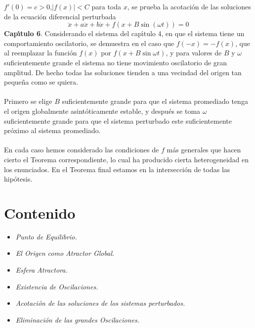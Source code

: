 \documentclass[letter]{article}
\begin{document}
$f'(0)=c>0$,\quad $|f(x)|<C$ para toda $x$, se prueba la acotaci{\'o}n
de las soluciones de la ecuaci{\'o}n diferencial perturbada
$$\dddot{x}+a\ddot{x}+b\dot{x}+f(x+B\sin(\omega t))=0$$
{\bf Cap{\'\i}tulo 6}.  Considerando el sistema del cap{\'\i}tulo 4, en que
el sistema  tiene un comportamiento oscilatorio, se demuestra en
el caso que $f(-x)=-f(x)$, que al reemplazar la funci{\'o}n $f(x)$ por
$f(x+B\sin\omega t)$, y para va\-lores de $B$ y $\omega$
suficientemente grande el sistema no tiene movimiento oscilatorio
de gran amplitud. De hecho todas las soluciones tienden a una
vecindad del origen tan peque{\~n}a como se quiera.
\\
\\
Primero se elige $B$ suficientemente grande para que el sistema
promediado tenga el origen globalmente asint{\'o}ticamente estable, y
despu{\'e}s se toma $\omega$ suficientemente grande para que el
sistema perturbado este suficientemente pr{\'o}ximo al sistema
promediado.
\\
\\
En cada caso hemos considerado las condiciones de $f$ m{\'a}s
generales que hacen cierto el Teorema correspondiente, lo cual ha
producido cierta heterogeneidad en los enunciados. En el Teorema
final estamos en la intersecci{\'o}n de todas las hip{\'o}tesis.
\section{Contenido}
\sffamily\Large
\begin{itemize}
\item \emph{Punto de Equilibrio.}\pause \item \emph{El Origen como
Atractor Global.} \pause \item \emph{Esfera Atractora.}\pause
\item\emph{Existencia de Oscilaciones.}\pause \item\emph{Acotaci{\'o}n
de las soluciones de los sistemas
\newline perturbados.}\pause \item\emph{Eliminaci{\'o}n de las
grandes Oscilaciones.}\pause
\end{itemize}
\headskip=20pt
\end{document}
